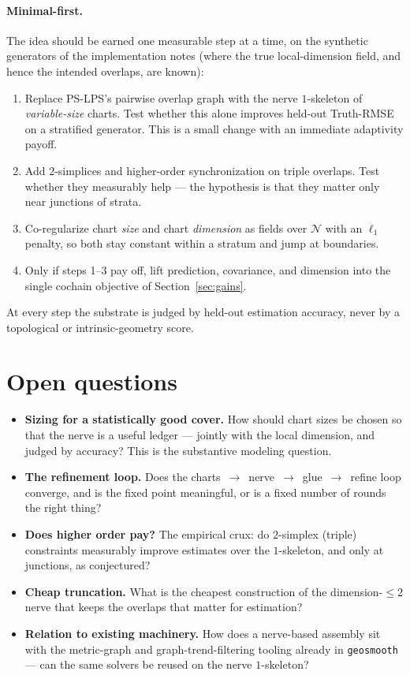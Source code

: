 \documentclass[11pt]{article}
\theoremstyle{definition}
\newcommand{\nerve}{\mathcal{N}}
\begin{document}
\paragraph{Minimal-first.} The idea should be earned one measurable step at a time,
on the synthetic generators of the implementation notes (where the true
local-dimension field, and hence the intended overlaps, are known):
\begin{enumerate}[leftmargin=1.6em]
\item Replace PS-LPS's pairwise overlap graph with the nerve $1$-skeleton of
\emph{variable-size} charts. Test whether this alone improves held-out
Truth-RMSE on a stratified generator. This is a small change with an immediate
adaptivity payoff.
\item Add $2$-simplices and higher-order synchronization on triple overlaps. Test
whether they measurably help --- the hypothesis is that they matter only near
junctions of strata.
\item Co-regularize chart \emph{size} and chart \emph{dimension} as fields over
$\nerve$ with an $\ell_1$ penalty, so both stay constant within a stratum and jump
at boundaries.
\item Only if steps 1--3 pay off, lift prediction, covariance, and dimension into
the single cochain objective of Section~\ref{sec:gains}.
\end{enumerate}
At every step the substrate is judged by held-out estimation accuracy, never by a
topological or intrinsic-geometry score.

\section{Open questions}\label{sec:open}

\begin{itemize}[leftmargin=1.4em]
\item \textbf{Sizing for a statistically good cover.} How should chart sizes be
chosen so that the nerve is a useful ledger --- jointly with the local dimension,
and judged by accuracy? This is the substantive modeling question.
\item \textbf{The refinement loop.} Does the charts~$\to$~nerve~$\to$~glue~$\to$~refine
loop converge, and is the fixed point meaningful, or is a fixed number of rounds
the right thing?
\item \textbf{Does higher order pay?} The empirical crux: do $2$-simplex (triple)
constraints measurably improve estimates over the $1$-skeleton, and only at
junctions, as conjectured?
\item \textbf{Cheap truncation.} What is the cheapest construction of the
dimension-$\le 2$ nerve that keeps the overlaps that matter for estimation?
\item \textbf{Relation to existing machinery.} How does a nerve-based assembly sit
with the metric-graph and graph-trend-filtering tooling already in
\texttt{geosmooth} --- can the same solvers be reused on the nerve $1$-skeleton?
\end{itemize}
\end{document}
